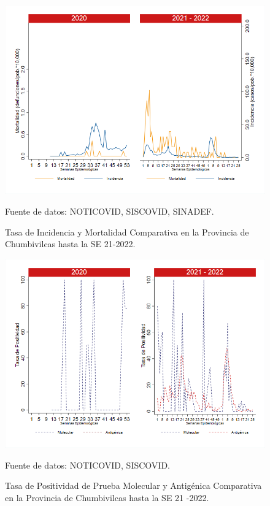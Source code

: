 \documentclass[12pt,a4paper,openany]{book}
\begin{document}
	\begin{figure}[h]
		\caption{Tasa de Incidencia y Mortalidad Comparativa en la Provincia de Chumbivilcas hasta la SE 21-2022.}\label{fig:inc_mort_chumbivilcas}
		\begin{center}
			\includegraphics[width=0.85\linewidth]{../figuras/incidencia_mortalidad_20_21_6.png}
		\end{center}
		{\footnotesize {Fuente de datos: NOTICOVID, SISCOVID, SINADEF.}}
	\end{figure}
	
	\begin{figure}[h]
		\caption{Tasa de Positividad de Prueba Molecular y Antigénica Comparativa en la Provincia de Chumbivilcas hasta la SE 21 -2022.}\label{fig:positividad_chumbivilcas}
		\begin{center}
			\includegraphics[width=0.7\linewidth]{../figuras/positividad_20_21_6.png}
		\end{center}
		{\footnotesize {Fuente de datos: NOTICOVID, SISCOVID.}}
	\end{figure}
	
\end{document}
